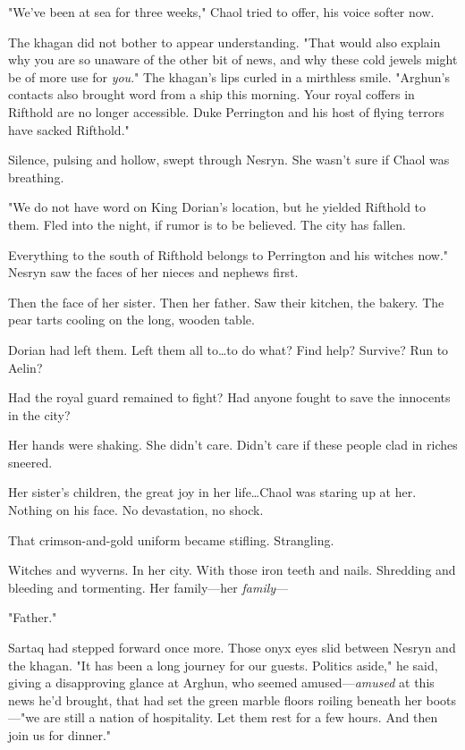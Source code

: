 "We've been at sea for three weeks," Chaol tried to offer, his voice softer now.

The khagan did not bother to appear understanding.
"That would also explain why you are so unaware of the other bit of news, and why these cold jewels might be of more use for \emph{you}."
The khagan's lips curled in a mirthless smile.
"Arghun's contacts also brought word from a ship this morning.
Your royal coffers in Rifthold are no longer accessible.
Duke Perrington and his host of flying terrors have sacked Rifthold."

Silence, pulsing and hollow, swept through Nesryn.
She wasn't sure if Chaol was breathing.

"We do not have word on King Dorian's location, but he yielded Rifthold to them.
Fled into the night, if rumor is to be believed.
The city has fallen.

Everything to the south of Rifthold belongs to Perrington and his witches now."
Nesryn saw the faces of her nieces and nephews first.

Then the face of her sister.
Then her father.
Saw their kitchen, the bakery.
The pear tarts cooling on the long, wooden table.

Dorian had left them.
Left them all to\ldots to do what?
Find help?
Survive?
Run to Aelin?

Had the royal guard remained to fight?
Had anyone fought to save the innocents in the city?

Her hands were shaking.
She didn't care.
Didn't care if these people clad in riches sneered.

Her sister's children, the great joy in her life\ldots Chaol was staring up at her.
Nothing on his face.
No devastation, no shock.

That crimson-and-gold uniform became stifling.
Strangling.

Witches and wyverns.
In her city.
With those iron teeth and nails.
Shredding and bleeding and tormenting.
Her family---her \emph{family}---

"Father."

Sartaq had stepped forward once more.
Those onyx eyes slid between Nesryn and the khagan.
"It has been a long journey for our guests.
Politics aside," he said, giving a disapproving glance at Arghun, who seemed amused---\emph{amused} at this news he'd brought, that had set the green marble floors roiling beneath her boots---"we are still a nation of hospitality.
Let them rest for a few hours.
And then join us for dinner."

